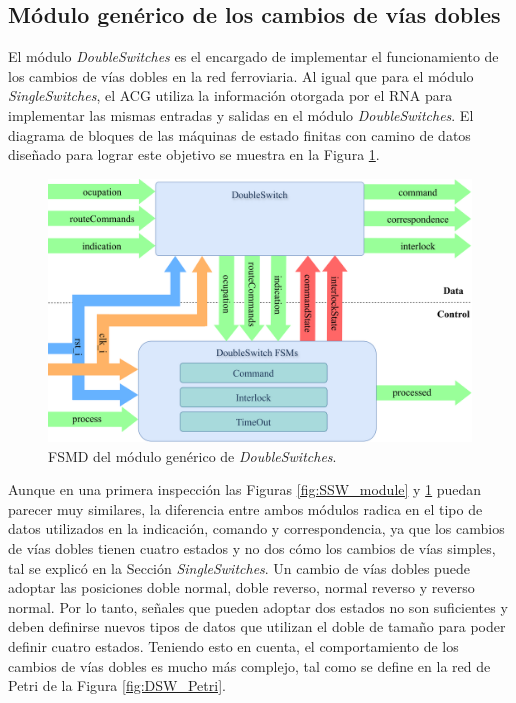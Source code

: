 \subsection{Módulo genérico de los cambios de vías dobles}

El módulo \textit{DoubleSwitches} es el encargado de implementar el funcionamiento de los cambios de vías dobles en la red ferroviaria. Al igual que para el módulo \textit{SingleSwitches}, el ACG utiliza la información otorgada por el RNA para implementar las mismas entradas y salidas en el módulo \textit{DoubleSwitches}. El diagrama de bloques de las máquinas de estado finitas con camino de datos diseñado para lograr este objetivo se muestra en la Figura \ref{fig:DSW_module}.

\begin{figure}[H]
	\centering
	\includegraphics[width=1\textwidth]{Figuras/DSW_module}
	\centering\caption{FSMD del módulo genérico de \textit{DoubleSwitches}.}
	\label{fig:DSW_module}
\end{figure}

Aunque en una primera inspección las Figuras \ref{fig:SSW_module} y \ref{fig:DSW_module} puedan parecer muy similares, la diferencia entre ambos módulos radica en el tipo de datos utilizados en la indicación, comando y correspondencia, ya que los cambios de vías dobles tienen cuatro estados y no dos cómo los cambios de vías simples, tal se explicó en la Sección \textit{SingleSwitches}. Un cambio de vías dobles puede adoptar las posiciones doble normal, doble reverso, normal reverso y reverso normal. Por lo tanto, señales que pueden adoptar dos estados no son suficientes y deben definirse nuevos tipos de datos que utilizan el doble de tamaño para poder definir cuatro estados. Teniendo esto en cuenta, el comportamiento de los cambios de vías dobles es mucho más complejo, tal como se define en la red de Petri de la Figura \ref{fig:DSW_Petri}.

